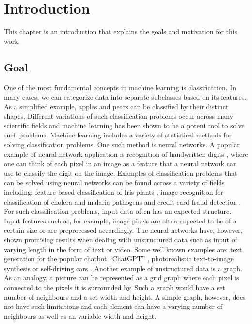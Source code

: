 \chapter{Introduction}

This chapter is an introduction that explains the goals and motivation for this work.

\section{Goal}

One of the most fundamental concepts in machine learning is classification. In many cases, we can categorize data into separate subclasses based on its features. As a simplified example, apples and pears can be classified by their distinct shapes. Different variations of such classification problems occur across many scientific fields and machine learning has been shown to be a potent tool to solve such problems. Machine learning includes a variety of statistical methods for solving classification problems. One such method is neural networks. A popular example of neural network application is recognition of handwritten digits \cite{digitrecognition}, where one can think of each pixel in an image as a feature that a neural network can use to classify the digit on the image.
Examples of classification problems that can be solved using neural networks can be found across a variety of fields including: feature based classification of Iris plants \cite{swain2012approach}, image recognition for classification of cholera and malaria pathogens \cite{TRAORE2018257} and credit card fraud detection \cite{cardfraud}. For such classification problems, input data often has an expected structure. Input features such as, for example, image pixels are often expected to be of a certain size or are preprocessed accordingly. The neural networks have, however, shown promising results when dealing with unstructured data such as input of varying length in the form of text or video. Some well known examples are: text generation for the popular chatbot “ChatGPT” \cite{RAY2023121}, photorealistic text-to-image synthesis \cite{Liao2022CVPR} or self-driving cars \cite{bojarski2016end}. Another example of unstructured data is a graph. As an analogy, a picture can be represented as a grid graph where each pixel is connected to the pixels it is surrounded by. Such a graph would have a set number of neighbours and a set width and height. A simple graph, however, does not have such limitations and each element can have a varying number of neighbours as well as an variable width and height. 

